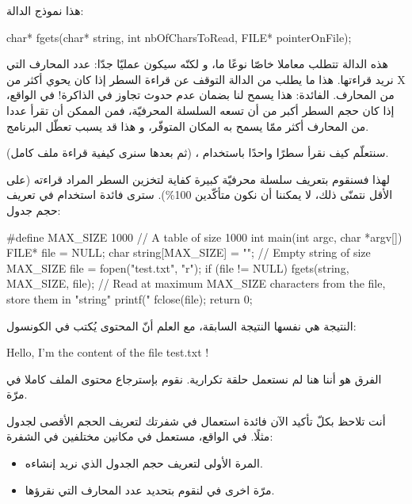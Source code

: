 هذا نموذج الدالة:

\begin{Csource}
char* fgets(char* string, int nbOfCharsToRead, FILE* pointerOnFile);
\end{Csource}

هذه الدالة تتطلب معاملا خاصّا نوعًا ما، و لكنّه سيكون عمليّا جدّا: عدد المحارف التي نريد قراءتها. هذا ما يطلب من الدالة
التوقف عن قراءة السطر إذا كان يحوي أكثر من
\textenglish{X}
من المحارف.
الفائدة: هذا يسمح لنا بضمان عدم حدوث تجاوز في الذاكرة! في الواقع، إذا كان حجم السطر أكبر من أن تسعه السلسلة المحرفيّة، فمن الممكن أن تقرأ عددا من المحارف أكثر ممّا يسمح به المكان المتوفّر، و هذا قد يسبب تعطّل البرنامج.

سنتعلّم كيف نقرأ سطرًا واحدًا باستخدام
،
(ثم  بعدها سنرى كيفية قراءة ملف كامل).

لهذا فسنقوم بتعريف سلسلة محرفيّة كبيرة كفاية لتخزين السطر المراد قراءته (على الأقل نتمنّى ذلك، لا يمكننا أن نكون متأكّدين
100\%).
سترى فائدة استخدام 
في تعريف حجم جدول:

\begin{Csource}
#define MAX_SIZE 1000 // A table of size 1000
int main(int argc, char *argv[])
{
    FILE* file = NULL;
    char string[MAX_SIZE] = ""; // Empty string of size MAX_SIZE
    file = fopen("test.txt", "r");
    if (file != NULL)
    {
        fgets(string, MAX_SIZE, file); // Read at maximum MAX_SIZE characters from the file, store them in  "string"
        printf("%
        fclose(file);
    }
    return 0;
}
\end{Csource}

النتيجة هي نفسها النتيجة السابقة، مع العلم أنّ المحتوى يُكتب في الكونسول:

\begin{Console}
Hello, I'm the content of the file test.txt !
\end{Console}

الفرق هو أننا هنا لم نستعمل حلقة تكرارية. نقوم بإسترجاع محتوى الملف كاملا في مرّة.

أنت تلاحظ بكلّ تأكيد الآن فائدة استعمال
في شفرتك لتعريف الحجم الأقصى لجدول مثلًا. في الواقع،
مستعمل في مكانين مختلفين في الشفرة:

\begin{itemize}
  \item المرة الأولى لتعريف حجم الجدول الذي نريد إنشاءه.
  \item مرّة اخرى في 
  لنقوم بتحديد عدد المحارف التي نقرؤها.
\end{itemize}


